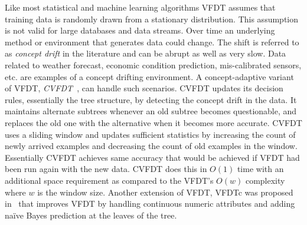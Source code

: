 Like most statistical and machine learning algorithms VFDT assumes that training data is randomly drawn from a stationary distribution. This assumption is not valid for large databases and data streams. Over time an underlying method or environment that generates data could change. The shift is  referred to as {\it concept drift} in the literature and can be abrupt as well as very slow. Data related to weather forecast, economic condition prediction, mis-calibrated sensors, etc. are examples of a concept drifting environment. A concept-adaptive variant of VFDT, \textit{CVFDT}~\cite{hulten01:cvfdt}, can handle such scenarios. CVFDT updates its decision rules, essentially the tree structure, by detecting the concept drift in the data. It maintains alternate subtrees whenever an old subtree becomes questionable, and replaces the old one with the alternative when it becomes more accurate. CVFDT uses a sliding window and updates sufficient statistics by increasing the count of newly arrived examples and decreasing the count of old examples in the window. Essentially CVFDT achieves same accuracy that would be achieved if VFDT had been run again with the new data. CVFDT does this in $O(1)$ time with an additional space requirement as compared to the VFDT's $O(w)$ complexity where $w$ is the window size. Another extension of VFDT, VFDTc was proposed in~\cite{gama05:vfdtc} that improves VFDT by handling continuous numeric attributes and adding na\"ive Bayes prediction at the leaves of the tree.



